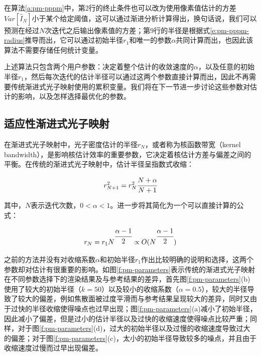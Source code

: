 在算法\ref{a:pm-pppm}中，第2行的终止条件也可以改为使用像素值估计的方差$Var[\hat{I}_N]$小于某个给定阈值，这可以通过渐进分析计算得出，换句话说，我们可以预测在经过$N$次迭代之后输出像素值的方差；第9行的半径是根据式\ref{e:pm-pppm-radius}推导而出，它可以通过初始半径$r_1$和唯一的参数$\alpha$共同计算而出，也因此该算法不需要存储任何统计变量。

上述算法只包含两个用户参数：决定着整个估计的收敛速度的$\alpha$，以及任意的初始半径$r_1$，然后每次迭代的估计半径可以通过这两个参数直接计算而出，因此不再需要传统渐进式光子映射使用的累积变量。我们将在下一节进一步讨论这些参数对估计的影响，以及怎样选择最优化的参数。





\subsection{适应性渐进式光子映射}\label{sec:pm-adaptive-ppm}
在渐进式光子映射中，光子密度估计的半径$r_N$，或者称为核函数带宽（kernel bandwidth），是影响核估计效率的重要参数，它决定着核估计方差与偏差之间的平衡。在传统的渐进式光子映射\cite{a:ProgressivePhotonMapping,a:ProgressivePhotonMappingAProbabilisticApproach}中，估计半径呈指数式收缩：

\begin{equation}
	r^{2}_{N+1}=r^{2}_{N} \cfrac{N+\alpha}{N+1}
\end{equation}

其中，$N$表示迭代次数，$0<\alpha<1$。\cite{a:AdaptiveProgressivePhotonMapping}进一步将其简化为一个可以直接计算的公式：

\begin{equation}\label{e:pm-radius}
	r_N=r_{1}N^{ \cfrac{\alpha-1}{2}}\propto O(N^{ \cfrac{\alpha-1}{2}})
\end{equation}

之前的方法并没有对收缩系数$\alpha$和初始半径$r_1$作出比较明确的说明和选择，这两个参数却对估计有很重要的影响。如图\ref{f:pm-parameters}表示传统的渐进式光子映射在不同参数选择下的渲染结果及与参考结果的差异，首先图\ref{f:pm-parameters}(b)使用了较大的初始半径（$k=50$）以及较小的收缩系数（$\alpha=0.5$），较大的半径导致了较大的偏差，例如焦散面被过度平滑而与参考结果呈现较大的差异，同时又由于过快的半径收缩使得噪点也过早出现；图\ref{f:pm-parameters}(a)减小了初始半径，因此减小了偏差，但是过小的估计半径以及过快的收缩速度使得噪点比较严重；同样，对于图\ref{f:pm-parameters}(d)，过大的初始半径以及过慢的收缩速度导致过大的偏差；对于图\ref{f:pm-parameters}(c)，太小的初始半径导致较多的噪点，并且由于收缩速度过慢而过早出现偏差。

